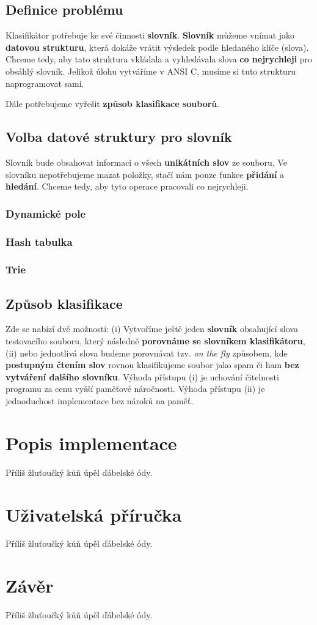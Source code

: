 \documentclass[12pt]{report}
\begin{document}
	\section{Definice problému}
	Klasifikátor potřebuje ke své činnosti \textbf{slovník}. \textbf{Slovník} můžeme vnímat jako \textbf{datovou strukturu}, která dokáže vrátit výsledek podle hledaného klíče (slova). Chceme tedy, aby tato struktura vkládala a vyhledávala slova \textbf{co nejrychleji} pro obsáhlý slovník. Jelikož úlohu vytváříme v ANSI C, musíme si tuto strukturu naprogramovat sami. 
	
	Dále potřebujeme vyřešit \textbf{způsob klasifikace souborů}.
	
	\section{Volba datové struktury pro slovník}
	Slovník bude obsahovat informaci o všech \textbf{unikátních slov} ze souboru. Ve slovníku nepotřebujeme mazat položky, stačí nám pouze funkce \textbf{přidání} a \textbf{hledání}. Chceme tedy, aby tyto operace pracovali co nejrychleji.
	
		\subsection{Dynamické pole}
	
		\subsection{Hash tabulka}
		
		\subsection{Trie}
	
	\section{Způsob klasifikace}
	Zde se nabízí dvě možnosti: (i) Vytvoříme ještě jeden \textbf{slovník} obsahující slova testovacího souboru, který následně \textbf{porovnáme se slovníkem klasifikátoru}, (ii) nebo jednotlivá slova budeme porovnávat tzv. \textit{on the fly} způsobem, kde \textbf{postupným čtením slov} rovnou klasifikujeme soubor jako spam či ham \textbf{bez vytváření dalšího slovníku}. Výhoda přístupu (i) je uchování čitelnosti programu za cenu vyšší paměťové náročnosti. Výhoda přístupu (ii) je jednoduchost implementace bez nároků na paměť.
	
	\chapter{Popis implementace}
	Příliš žluťoučký kůň úpěl ďábelské ódy.
	
	\chapter{Uživatelská příručka}
	Příliš žluťoučký kůň úpěl ďábelské ódy.
	
	\chapter{Závěr}
	Příliš žluťoučký kůň úpěl ďábelské ódy.
	
\end{document}

